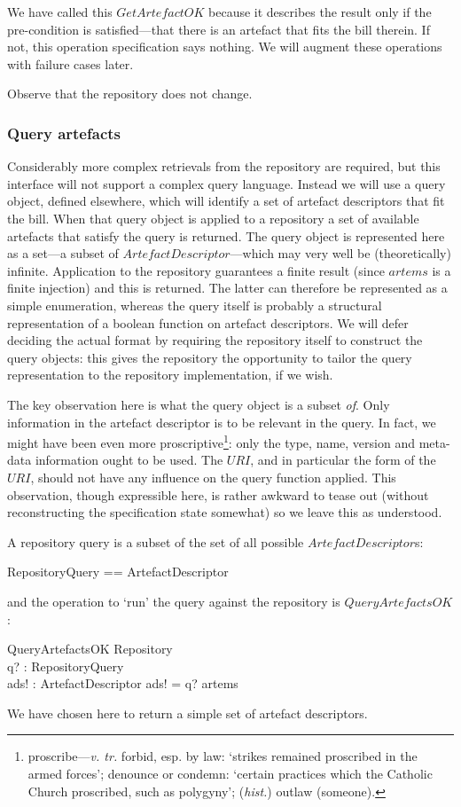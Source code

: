\documentclass[a4paper,titlepage,twoside,12pt]{article}
\begin{document}
We have called this $GetArtefactOK$ because it describes the result only if the pre-condition is satisfied---that there is an artefact that fits the bill therein. If not, this operation specification says nothing. We will augment these operations with failure cases later.

Observe that the repository does not change.

\subsubsection{Query artefacts}
Considerably more complex retrievals from the repository are required, but this interface will not support a complex query language. Instead we will use a query object, defined elsewhere, which will identify a set of artefact descriptors that fit the bill. When that query object is applied to a repository a set of available artefacts that satisfy the query is returned.  The query object is represented here as a set---a subset of $ArtefactDescriptor$---which may very well be (theoretically) infinite. Application to the repository guarantees a finite result (since $artems$ is a finite injection) and this is returned. The latter can therefore be represented as a simple enumeration, whereas the query itself is probably a structural representation of a boolean function on artefact descriptors. We will defer deciding the actual format by requiring the repository itself to construct the query objects: this gives the repository the opportunity to tailor the query representation to the repository implementation, if we wish.

The key observation here is what the query object is a subset \emph{of}. Only information in the artefact descriptor is to be relevant in the query. In fact, we might have been even more proscriptive\footnote{proscribe---\emph{v. tr.} forbid, esp. by law: `strikes remained proscribed in the armed forces'; denounce or condemn: `certain practices which the Catholic Church proscribed, such as polygyny'; (\emph{hist.}) outlaw (someone).}: only the type, name, version and meta-data information ought to be used. The $URI$, and in particular the form of the $URI$, should not have any influence on the query function applied. This observation, though expressible here, is rather awkward to tease out (without reconstructing the specification state somewhat) so we leave this as understood.

A repository query is a subset of the set of all possible $ArtefactDescriptor$s:
\begin{zed}
	RepositoryQuery == \power ArtefactDescriptor
\end{zed}
and the operation to `run' the query against the repository is $QueryArtefactsOK$:
\begin{schema}{QueryArtefactsOK}
	\Xi Repository	\\
	q? : RepositoryQuery	\\
	ads! : \finset ArtefactDescriptor
\where
	ads! = q? \cap \ran artems
\end{schema}
We have chosen here to return a simple set of artefact descriptors.	
\end{document}
